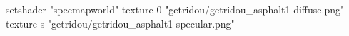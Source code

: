 setshader "specmapworld"
texture 0 "getridou/getridou_asphalt1-diffuse.png"
texture s "getridou/getridou_asphalt1-specular.png"
